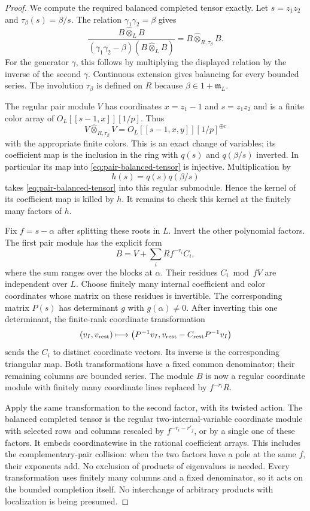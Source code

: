 \documentclass[11pt]{article}
\theoremstyle{definition}\newtheorem{definition}[theorem]{Definition}
\begin{document}
\begin{proof}
We compute the required balanced completed tensor
exactly. Let $s=z_1z_2$ and
$\tau_\beta(s)=\beta/s$. The relation
$\gamma_1\gamma_2=\beta$ gives
\begin{equation}\label{eq:pair-balanced-tensor}
 \frac{B\widehat\otimes_L B}
 { (\gamma_1\gamma_2-\beta)(B\widehat\otimes_L B)}
       =B\widehat\otimes_{R,\tau_\beta}B.
\end{equation}
For the generator $\gamma$, this follows by multiplying
the displayed relation by the inverse of the second
$\gamma$. Continuous extension gives balancing for
every bounded series. The involution $\tau_\beta$ is
defined on $R$ because $\beta\in1+\mathfrak m_L$.

The regular pair module $V$ has coordinates
$x=z_1-1$ and $s=z_1z_2$ and is a finite color array of
$O_L[[s-1,x]][1/p]$. Thus
\[
 V\widehat\otimes_{R,\tau_\beta}V
       =O_L[[s-1,x,y]][1/p]^{\oplus c}
\]
with the appropriate finite colors. This is an exact
change of variables; its coefficient map is the
inclusion in the ring with $q(s)$ and $q(\beta/s)$
inverted. In particular its map into
\eqref{eq:pair-balanced-tensor} is injective.
Multiplication by
\[
                           h(s)=q(s)q(\beta/s)
\]
takes \eqref{eq:pair-balanced-tensor} into this regular
submodule. Hence the kernel of its coefficient map
is killed by $h$. It remains to check this kernel
at the finitely many factors of $h$.

Fix $f=s-\alpha$ after splitting these roots in $L$.
Invert the other polynomial factors. The first pair
module has the explicit form
\[
              B=V+\sum_i R f^{-r_i}C_i,
\]
where the sum ranges over the blocks at $\alpha$.
Their residues $C_i\bmod fV$ are independent over $L$.
Choose finitely many internal coefficient and color
coordinates whose matrix on these residues is
invertible. The corresponding matrix $P(s)$ has
determinant $g$ with $g(\alpha)\ne0$. After inverting
this one determinant, the finite-rank coordinate
transformation
\[
 (v_I,v_{\rm rest})\longmapsto
 \bigl(P^{-1}v_I,
               v_{\rm rest}-C_{\rm rest}P^{-1}v_I\bigr)
\]
sends the $C_i$ to distinct coordinate vectors.
Its inverse is the corresponding triangular map.
Both transformations have a fixed common denominator;
their remaining columns are bounded series. The module
$B$ is now a regular coordinate module with finitely
many coordinate lines replaced by $f^{-r_i}R$.

Apply the same transformation to the second factor,
with its twisted action. The balanced completed tensor
is the regular two-internal-variable coordinate module
with selected rows and columns rescaled by
$f^{-r_i-r'_j}$, or by a single one of these factors.
It embeds coordinatewise in the rational coefficient
arrays. This includes the complementary-pair collision:
when the two factors have a pole at the same $f$, their
exponents add. No exclusion of products of eigenvalues
is needed. Every transformation uses finitely many
columns and a fixed denominator, so it acts on the
bounded completion itself. No interchange of arbitrary
products with localization is being presumed.


\end{proof}
\end{document}
